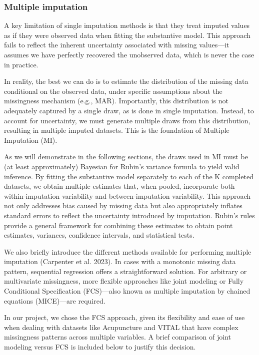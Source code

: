 \documentclass{article}
\begin{document}
\subsubsection{Multiple imputation}\label{multiple-imputation}

A key limitation of single imputation methods is that they treat imputed
values as if they were observed data when fitting the substantive model.
This approach fails to reflect the inherent uncertainty associated with
missing values---it assumes we have perfectly recovered the unobserved
data, which is never the case in practice.

In reality, the best we can do is to estimate the distribution of the
missing data conditional on the observed data, under specific
assumptions about the missingness mechanism (e.g., MAR). Importantly,
this distribution is not adequately captured by a single draw, as is
done in single imputation. Instead, to account for uncertainty, we must
generate multiple draws from this distribution, resulting in multiple
imputed datasets. This is the foundation of Multiple Imputation (MI).

As we will demonstrate in the following sections, the draws used in MI
must be (at least approximately) Bayesian for Rubin's variance formula
to yield valid inference. By fitting the substantive model separately to
each of the K completed datasets, we obtain multiple estimates that,
when pooled, incorporate both within-imputation variability and
between-imputation variability. This approach not only addresses bias
caused by missing data but also appropriately inflates standard errors
to reflect the uncertainty introduced by imputation. Rubin's rules
provide a general framework for combining these estimates to obtain
point estimates, variances, confidence intervals, and statistical tests.

We also briefly introduce the different methods available for performing
multiple imputation (Carpenter et al. 2023). In cases with a monotonic
missing data pattern, sequential regression offers a straightforward
solution. For arbitrary or multivariate missingness, more flexible
approaches like joint modeling or Fully Conditional Specification
(FCS)---also known as multiple imputation by chained equations
(MICE)---are required.

In our project, we chose the FCS approach, given its flexibility and
ease of use when dealing with datasets like Acupuncture and VITAL that
have complex missingness patterns across multiple variables. A brief
comparison of joint modeling versus FCS is included below to justify
this decision.
\end{document}
